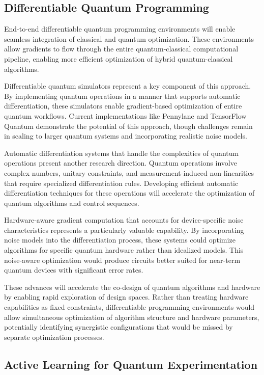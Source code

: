 \subsection{Differentiable Quantum Programming}

End-to-end differentiable quantum programming environments will enable seamless integration of classical and quantum optimization. These environments allow gradients to flow through the entire quantum-classical computational pipeline, enabling more efficient optimization of hybrid quantum-classical algorithms.

Differentiable quantum simulators represent a key component of this approach. By implementing quantum operations in a manner that supports automatic differentiation, these simulators enable gradient-based optimization of entire quantum workflows. Current implementations like Pennylane and TensorFlow Quantum demonstrate the potential of this approach, though challenges remain in scaling to larger quantum systems and incorporating realistic noise models.

Automatic differentiation systems that handle the complexities of quantum operations present another research direction. Quantum operations involve complex numbers, unitary constraints, and measurement-induced non-linearities that require specialized differentiation rules. Developing efficient automatic differentiation techniques for these operations will accelerate the optimization of quantum algorithms and control sequences.

Hardware-aware gradient computation that accounts for device-specific noise characteristics represents a particularly valuable capability. By incorporating noise models into the differentiation process, these systems could optimize algorithms for specific quantum hardware rather than idealized models. This noise-aware optimization would produce circuits better suited for near-term quantum devices with significant error rates.

These advances will accelerate the co-design of quantum algorithms and hardware by enabling rapid exploration of design spaces. Rather than treating hardware capabilities as fixed constraints, differentiable programming environments would allow simultaneous optimization of algorithm structure and hardware parameters, potentially identifying synergistic configurations that would be missed by separate optimization processes.

\subsection{Active Learning for Quantum Experimentation}

